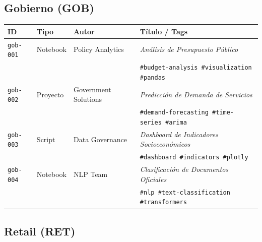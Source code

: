 \documentclass[12pt, a4paper]{article}
\begin{document}
\subsection{Gobierno (GOB)}

\begin{longtable}{lllp{5.5cm}}
\toprule
\textbf{ID} & \textbf{Tipo} & \textbf{Autor} & \textbf{Título / Tags} \\
\midrule
\endhead
\texttt{gob-001} & Notebook & Policy Analytics      & \textit{Análisis de Presupuesto Público}\\
                 &          &                       & \texttt{\#budget-analysis \#visualization \#pandas} \\[6pt]
\texttt{gob-002} & Proyecto & Government Solutions  & \textit{Predicción de Demanda de Servicios}\\
                 &          &                       & \texttt{\#demand-forecasting \#time-series \#arima} \\[6pt]
\texttt{gob-003} & Script   & Data Governance       & \textit{Dashboard de Indicadores Socioeconómicos}\\
                 &          &                       & \texttt{\#dashboard \#indicators \#plotly} \\[6pt]
\texttt{gob-004} & Notebook & NLP Team              & \textit{Clasificación de Documentos Oficiales}\\
                 &          &                       & \texttt{\#nlp \#text-classification \#transformers} \\
\bottomrule
\end{longtable}

\subsection{Retail (RET)}
\end{document}
